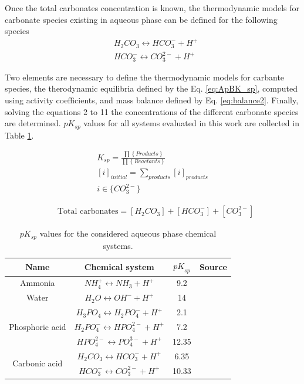 \begin{refsection}[referencesCh3]
Once the total carbonates concentration is known, the thermodynamic models for carbonate species existing in aqueous phase can be defined for the following species
\begin{align*}
& H_{2}CO_{3} \leftrightarrow HCO_{3}^{-} + H^{+} \\ 
& HCO_{3}^{-} \leftrightarrow CO_{3}^{2-} + H^{+}
\end{align*}

Two elements are necessary to define the thermodynamic models for carbante species, the therodynamic equilibria defined by the Eq. \ref{eq:ApBK_sp}, computed using activity coefficients, and mass balance defined by Eq. \ref{eq:balance2}. Finally, solving the equations 2 to 11 the concentrations of the different carbonate species are determined. $pK_{sp}$ values for all systems evaluated in this work are collected in Table \ref{table:ApBpK}.

\begin{align} \label{eq:ApBK_sp}
& K_{sp} = \frac{ \prod \left\{ Products \right\} }{ \prod \left\{ Reactants \right\}  }&
\\
& \left[ i \right]_{initial} =  \sum_{products} \left[i\right]_{products} \label{eq:ApBbalance1}&
\\
& i \in \bigl\{{CO_{3}^{2-}} \bigr\}  \nonumber&
\end{align}

\begin{align} \label{eq:balance2}
& \text{Total carbonates} = \left[  H_{2}CO_{3}\right] + \left[ HCO_{3}^{-}\right] + \left[ CO_{3}^{2-}\right]
\end{align}

\begin{table}[h] 
	\begin{adjustwidth}{}{}
		\centering
		\caption{$pK_{{sp}}$ values for the considered aqueous phase chemical systems.} \label{table:ApBpK}
		\begin{tabular}{c c c c}
			\toprule
			Name	& Chemical system &${pK}_{{sp}}$	&Source	\\ \midrule
			Ammonia & $NH_{4}^{+} \leftrightarrow NH_{3} + H^{+}$	&9.2 &\cite{Bates}	\\ 
			Water & $H_{2}O \leftrightarrow OH^{-} + H^{+}$	&14  &\cite{Skoog}	\\ 
			\multirow{3}{*}{Phosphoric acid} & $H_{3}PO_{4} \leftrightarrow H_{2}PO_{4}^{-} + H^{+}$	&2.1	&\cite{Ohlinger}	\\ 
			&$H_{2}PO_{4}^{-} \leftrightarrow HPO_{4}^{2-} + H^{+}$	&7.2  &\cite{Ohlinger}	\\ 
			&$HPO_{4}^{2-} \leftrightarrow PO_{4}^{3-} + H^{+}$	&12.35 &\cite{Ohlinger}	\\ 
			\multirow{2}{*}{Carbonic acid} & $H_{2}CO_{3} \leftrightarrow HCO_{3}^{-} + H^{+}$	&6.35	&\cite{Skoog}	\\  
			&$HCO_{3}^{-} \leftrightarrow CO_{3}^{2-} + H^{+}$	&10.33	&\cite{Skoog}	\\ \bottomrule
		\end{tabular}
	\end{adjustwidth}
\end{table}


\end{refsection}
